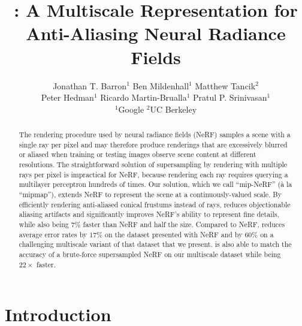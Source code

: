 \documentclass[10pt,twocolumn,letterpaper]{article}
\begin{document}


\title{\!\!\shortmodelname: A Multiscale Representation for Anti-Aliasing Neural Radiance Fields\!}


\author{
Jonathan T. Barron$^1$
\quad
Ben Mildenhall$^1$
\quad
Matthew Tancik$^2$
\\
\quad Peter Hedman$^1$
\quad
Ricardo Martin-Brualla$^1$
\quad
Pratul P. Srinivasan$^1$ \\
\vspace{2mm}
{$^1$Google \quad $^2$UC Berkeley}
}
%

\maketitle
\ificcvfinal\thispagestyle{empty}\fi

\begin{abstract}
The rendering procedure used by neural radiance fields (NeRF) samples a scene with a single ray per pixel and may therefore produce renderings that are excessively blurred or aliased when training or testing images observe scene content at different resolutions. The straightforward solution of supersampling by rendering with multiple rays per pixel is impractical for NeRF, because rendering each ray requires querying a multilayer perceptron hundreds of times. Our solution, which we call ``mip-NeRF'' (à la ``mipmap''), extends NeRF to represent the scene at a continuously-valued scale.
By efficiently rendering anti-aliased conical frustums instead of rays, \shortmodelnamelower reduces objectionable aliasing artifacts and significantly improves NeRF's ability to represent fine details, while also being $7\%$ faster than NeRF and half the size.
Compared to NeRF, \shortmodelnamelower reduces average error rates by $17\%$ on the dataset presented with NeRF and by $60\%$ on a challenging multiscale variant of that dataset that we present. \shortmodelname is also able to match the accuracy of a brute-force supersampled NeRF on our multiscale dataset while being $22\!\times$ faster.
\end{abstract}


\section{Introduction}
\end{document}
